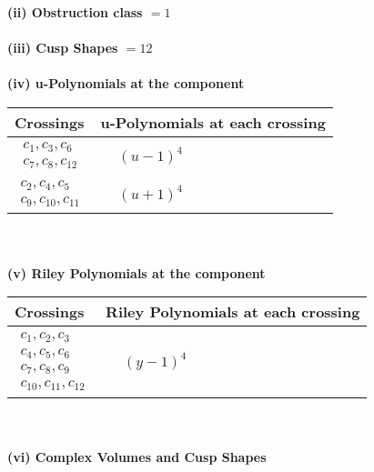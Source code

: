 \documentclass[1p]{elsarticle_modified}
\theoremstyle{definition}
\begin{document}
\flushleft \textbf{(ii) Obstruction class $= 1$}\\~\\
\flushleft \textbf{(iii) Cusp Shapes $= 12$}\\~\\
\newpage\renewcommand{\arraystretch}{1}
\flushleft \textbf{(iv) u-Polynomials at the component}\newline \\
\begin{tabular}{m{50pt}|m{274pt}}
Crossings & \hspace{64pt}u-Polynomials at each crossing \\
\hline $$\begin{aligned}c_{1},c_{3},c_{6}\\c_{7},c_{8},c_{12}\end{aligned}$$&$\begin{aligned}
&(u-1)^4
\end{aligned}$\\
\hline $$\begin{aligned}c_{2},c_{4},c_{5}\\c_{9},c_{10},c_{11}\end{aligned}$$&$\begin{aligned}
&(u+1)^4
\end{aligned}$\\
\hline
\end{tabular}\\~\\
\newpage\renewcommand{\arraystretch}{1}
\flushleft \textbf{(v) Riley Polynomials at the component}\newline \\
\begin{tabular}{m{50pt}|m{274pt}}
Crossings & \hspace{64pt}Riley Polynomials at each crossing \\
\hline $$\begin{aligned}c_{1},c_{2},c_{3}\\c_{4},c_{5},c_{6}\\c_{7},c_{8},c_{9}\\c_{10},c_{11},c_{12}\end{aligned}$$&$\begin{aligned}
&(y-1)^4
\end{aligned}$\\
\hline
\end{tabular}\\~\\
\newpage\flushleft \textbf{(vi) Complex Volumes and Cusp Shapes}
\end{document}
